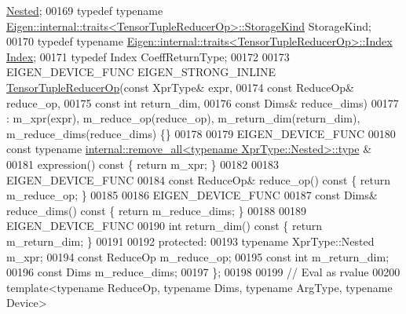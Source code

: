 \begin{DoxyCode}
       \hyperlink{class_eigen_1_1internal_1_1_tensor_lazy_evaluator_writable}{Nested};
00169   \textcolor{keyword}{typedef} \textcolor{keyword}{typename} \hyperlink{struct_eigen_1_1internal_1_1traits}{Eigen::internal::traits<TensorTupleReducerOp>::StorageKind}
       StorageKind;
00170   \textcolor{keyword}{typedef} \textcolor{keyword}{typename} \hyperlink{struct_eigen_1_1internal_1_1traits}{Eigen::internal::traits<TensorTupleReducerOp>::Index}
       \hyperlink{namespace_eigen_a62e77e0933482dafde8fe197d9a2cfde}{Index};
00171   \textcolor{keyword}{typedef} Index CoeffReturnType;
00172 
00173   EIGEN\_DEVICE\_FUNC EIGEN\_STRONG\_INLINE \hyperlink{class_eigen_1_1_tensor_tuple_reducer_op}{TensorTupleReducerOp}(\textcolor{keyword}{const} XprType& expr,
00174                                                           \textcolor{keyword}{const} ReduceOp& reduce\_op,
00175                                                           \textcolor{keyword}{const} \textcolor{keywordtype}{int} return\_dim,
00176                                                           \textcolor{keyword}{const} Dims& reduce\_dims)
00177       : m\_xpr(expr), m\_reduce\_op(reduce\_op), m\_return\_dim(return\_dim), m\_reduce\_dims(reduce\_dims) \{\}
00178 
00179   EIGEN\_DEVICE\_FUNC
00180   \textcolor{keyword}{const} \textcolor{keyword}{typename} \hyperlink{group___sparse_core___module}{internal::remove\_all<typename XprType::Nested>::type}
      &
00181   expression()\textcolor{keyword}{ const }\{ \textcolor{keywordflow}{return} m\_xpr; \}
00182 
00183   EIGEN\_DEVICE\_FUNC
00184   \textcolor{keyword}{const} ReduceOp& reduce\_op()\textcolor{keyword}{ const }\{ \textcolor{keywordflow}{return} m\_reduce\_op; \}
00185 
00186   EIGEN\_DEVICE\_FUNC
00187   \textcolor{keyword}{const} Dims& reduce\_dims()\textcolor{keyword}{ const }\{ \textcolor{keywordflow}{return} m\_reduce\_dims; \}
00188 
00189   EIGEN\_DEVICE\_FUNC
00190   \textcolor{keywordtype}{int} return\_dim()\textcolor{keyword}{ const }\{ \textcolor{keywordflow}{return} m\_return\_dim; \}
00191 
00192   \textcolor{keyword}{protected}:
00193     \textcolor{keyword}{typename} XprType::Nested m\_xpr;
00194     \textcolor{keyword}{const} ReduceOp m\_reduce\_op;
00195     \textcolor{keyword}{const} \textcolor{keywordtype}{int} m\_return\_dim;
00196     \textcolor{keyword}{const} Dims m\_reduce\_dims;
00197 \};
00198 
00199 \textcolor{comment}{// Eval as rvalue}
00200 \textcolor{keyword}{template}<\textcolor{keyword}{typename} ReduceOp, \textcolor{keyword}{typename} Dims, \textcolor{keyword}{typename} ArgType, \textcolor{keyword}{typename} Device>

\end{DoxyCode}
